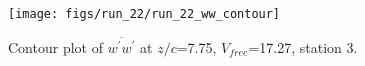 \begin{figure}[H]
\centering
\texttt{[image: figs/run\_22/run\_22\_ww\_contour]}
\caption{Contour plot of $\overline{w^\prime w^\prime}$ at $z/c$=7.75, $V_{free}$=17.27, station 3.}
\label{fig:run_22_ww_contour}
\end{figure}


